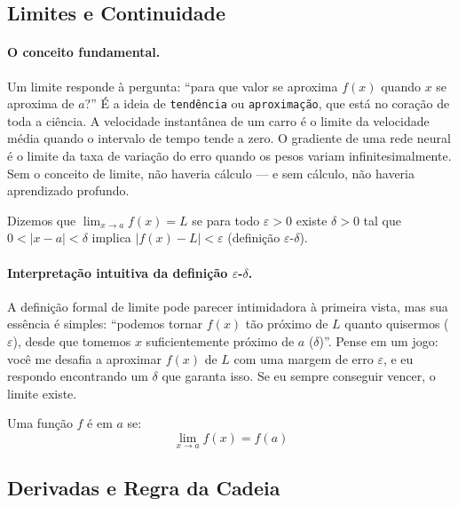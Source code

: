 \subsection{Limites e Continuidade}

\paragraph{O conceito fundamental.} Um limite responde à pergunta: ``para
que valor se aproxima $f(x)$ quando $x$ se aproxima de $a$?'' É a ideia de
\lstinline{tendência} ou \lstinline{aproximação}, que está no coração de
toda a ciência. A velocidade instantânea de um carro é o limite da velocidade
média quando o intervalo de tempo tende a zero. O gradiente de uma rede
neural é o limite da taxa de variação do erro quando os pesos variam
infinitesimalmente. Sem o conceito de limite, não haveria cálculo --- e sem
cálculo, não haveria aprendizado profundo.

\begin{definicao}
    Dizemos que $\lim_{x \to a} f(x) = L$ se para todo $\varepsilon > 0$
    existe $\delta > 0$ tal que $0 < |x - a| < \delta$ implica
    $|f(x) - L| < \varepsilon$ (definição $\varepsilon$-$\delta$).
\end{definicao}

\paragraph{Interpretação intuitiva da definição $\varepsilon$-$\delta$.}
A definição formal de limite pode parecer intimidadora à primeira vista, mas
sua essência é simples: ``podemos tornar $f(x)$ tão próximo de $L$ quanto
quisermos ($\varepsilon$), desde que tomemos $x$ suficientemente próximo de
$a$ ($\delta$)''. Pense em um jogo: você me desafia a aproximar $f(x)$ de
$L$ com uma margem de erro $\varepsilon$, e eu respondo encontrando um
$\delta$ que garanta isso. Se eu sempre conseguir vencer, o limite existe.

\begin{definicao}[Continuidade]
    Uma função $f$ é  em $a$ se:
    \[
    \lim_{x \to a} f(x) = f(a)
    \]
\end{definicao}

\subsection{Derivadas e Regra da Cadeia}

